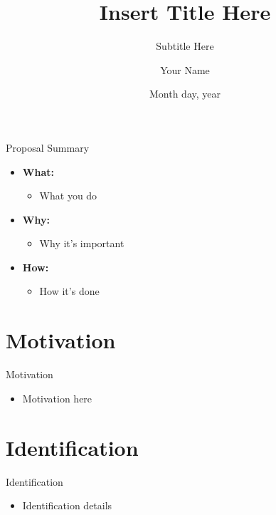 \documentclass[10pt,
			   handout
			   ]{beamer}
\title{Insert Title Here}
\subtitle{Subtitle Here}
\date{Month day, year}
\author{Your Name}
\institute{Econ 999}
\begin{document}
\tslide


\begin{frame}{Proposal Summary}
    \begin{itemize}
        \item \textbf{What:}
        \begin{itemize}
            \item What you do
        \end{itemize}
    \end{itemize}
    \pause
    \begin{itemize}
        \item \textbf{Why:}
        \begin{itemize}
            \item Why it's important
        \end{itemize}
    \end{itemize}
    \pause
    \begin{itemize}
        \item \textbf{How:}
        \begin{itemize}
            \item How it's done
        \end{itemize}
    \end{itemize}
\end{frame}


\section{Motivation}

\begin{frame}{Motivation}
    \begin{itemize}
    	\item Motivation here
    \end{itemize}
\end{frame}

\section{Identification}

\begin{frame}{Identification}
    \begin{itemize}[<+->]
        \item Identification details
    \end{itemize}
\end{frame}
\end{document}
